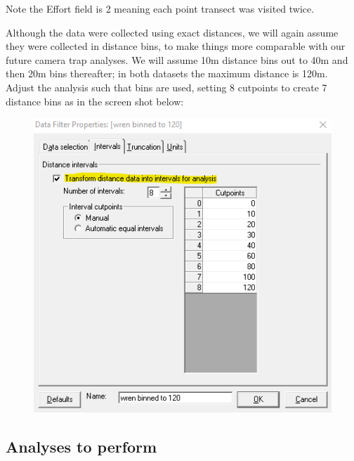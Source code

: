 \documentclass[a4paper]{article}
\begin{document}
Note the Effort field is 2 meaning each point transect was visited twice.

Although the data were collected using exact distances, we will again assume they were collected in distance bins, to make things more comparable with our future camera trap analyses. We will assume 10m distance bins out to 40m and then 20m bins thereafter; in both datasets the maximum distance is 120m. Adjust the analysis such that bins are used, setting 8 cutpoints to create 7 distance bins as in the screen shot below:

\begin{figure}
\centering
\includegraphics[scale=0.5]{DistWingrabs/transform-to-bins.png}
\end{figure}

\subsection{Analyses to perform}
\end{document}
